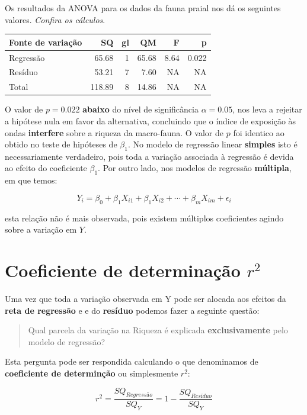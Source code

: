 \documentclass[
]{book}
\begin{document}
Os resultados da ANOVA para os dados da fauna praial nos dá os seguintes valores. \emph{Confira os cálculos}.

\begin{tabular}{l|r|r|r|r|r}
\hline
Fonte de variação & SQ & gl & QM & F & p\\
\hline
Regressão & 65.68 & 1 & 65.68 & 8.64 & 0.022\\
\hline
Resíduo & 53.21 & 7 & 7.60 & NA & NA\\
\hline
Total & 118.89 & 8 & 14.86 & NA & NA\\
\hline
\end{tabular}

O valor de \(p = 0.022\) \textbf{abaixo} do nível de significância \(\alpha = 0.05\), nos leva a rejeitar a hipótese nula em favor da alternativa, concluindo que o índice de exposição às ondas \textbf{interfere} sobre a riqueza da macro-fauna. O valor de \(p\) foi identico ao obtido no teste de hipóteses de \(\beta_1\). No modelo de regressão linear \textbf{simples} isto é necessariamente verdadeiro, pois toda a variação associada à regressão é devida ao efeito do coeficiente \(\beta_1\). Por outro lado, nos modelos de regressão \textbf{múltipla}, em que temos:

\[Y_i = \beta_0 + \beta_1X_{i1} + \beta_1X_{i2} + \cdots + \beta_mX_{im} + \epsilon_i\]

esta relação não é mais observada, pois existem múltiplos coeficientes agindo sobre a variação em \(Y\).

\hypertarget{coeficiente-de-determinauxe7uxe3o-r2}{%
\section{\texorpdfstring{Coeficiente de determinação \(r^2\)}{Coeficiente de determinação r\^{}2}}\label{coeficiente-de-determinauxe7uxe3o-r2}}

Uma vez que toda a variação observada em Y pode ser alocada aos efeitos da \textbf{reta de regressão} e e do \textbf{resíduo} podemos fazer a seguinte questão:

\begin{quote}
Qual parcela da variação na Riqueza é explicada \textbf{exclusivamente} pelo modelo de regressão?
\end{quote}

Esta pergunta pode ser respondida calculando o que denominamos de \textbf{coeficiente de determinção} ou simplesmente \(r^2\):

\[r^2 = \frac{SQ_{Regressão}}{SQ_Y} = 1 - \frac{SQ_{Resíduo}}{SQ_Y}\]
\end{document}
